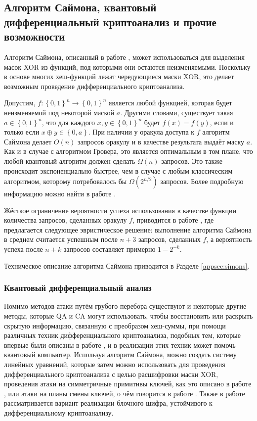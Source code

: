 \documentclass{mrl}
\begin{document}
\subsection{Алгоритм Саймона, квантовый дифференциальный криптоанализ и прочие возможности}\label{subsec:simonsalgo}

Алгоритм Саймона, описанный в работе \cite{simon1997power}, может использоваться для выделения масок XOR из функций, под которыми они остаются неизменяемыми. Поскольку в основе многих хеш-функций лежат чередующиеся маски XOR, это делает возможным проведение дифференциального криптоанализа.

Допустим, $f:\left\{0,1\right\}^n \to \left\{0,1\right\}^n$ является любой функцией, которая будет неизменяемой под некоторой маской $a$. Другими словами, существует такая $a \in \left\{0,1\right\}^n$, что для каждого $x, y \in \left\{0,1\right\}^n$ будет $f(x) = f(y)$, если и только если $x \oplus y \in \left\{0, a\right\}$. При наличии у оракула доступа к $f$ алгоритм Саймона делает $O(n)$ запросов оракулу и в качестве результата выдаёт маску $a$. Как и в случае с алгоритмом Гровера, это является оптимальным в том плане, что любой квантовый алгоритм должен сделать $\Omega(n)$ запросов. Это также происходит экспоненциально быстрее, чем в случае с любым классическим алгоритмом, которому потребовалось бы $\Omega(2^{n/2})$ запросов. Более подробную информацию можно найти в работе \cite{koiran2005quantum}.

Жёсткое ограничение вероятности успеха использования в качестве функции количества запросов, сделанных оракулу $f$, приводится в работе \cite{bonnetaintight}, где предлагается следующее эвристическое решение: выполнение алгоритма Саймона в среднем считается успешным после $n + 3$ запросов, сделанных $f$, а вероятность успеха после $n + k$ запросов составляет примерно $1 - 2^{-k}$.

Техническое описание алгоритма Саймона приводится в Разделе \ref{appsec:simons}.

\subsubsection{Квантовый дифференциальный анализ}

Помимо методов атаки путём грубого перебора существуют и некоторые другие методы, которые QA и CA могут использовать, чтобы восстановить или раскрыть скрытую информацию, связанную с преобразом хеш-суммы, при помощи различных техник дифференциального криптоанализа, подобных тем, которые впервые были описаны в работе \cite{biham1991differential}, и в реализации этих техник может помочь квантовый компьютер. Используя алгоритм Саймона, можно создать систему линейных уравнений, которые затем можно использовать для проведения дифференциального криптоанализа с целью расшифровки маски XOR, проведения атаки на симметричные примитивы ключей, как это описано в работе \cite{santoli2016using}, или атаки на планы смены ключей, о чём говорится в работе \cite{biham1991differential}. Также в работе \cite{wu2011security} рассматривается вариант реализации блочного шифра, устойчивого к дифференциальному криптоанализу.
\end{document}
